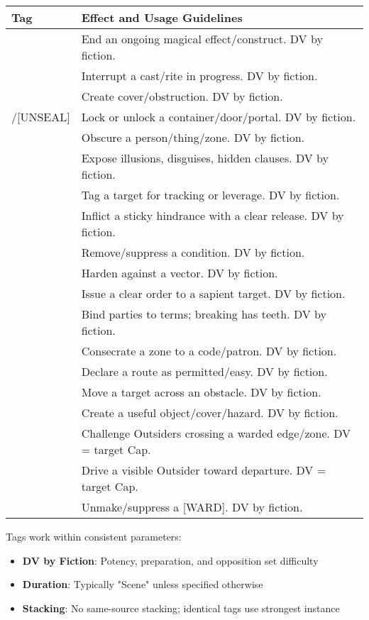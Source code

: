 \begin{fatebox}
\begin{tabularx}{\textwidth}{lX}
\toprule
\textbf{Tag} & \textbf{Effect and Usage Guidelines} \\
\midrule
[DISPEL] & End an ongoing magical effect/construct. DV by fiction. \\
[COUNTER] & Interrupt a cast/rite in progress. DV by fiction. \\
[BARRIER] & Create cover/obstruction. DV by fiction. \\
[SEAL]/[UNSEAL] & Lock or unlock a container/door/portal. DV by fiction. \\
[VEIL] & Obscure a person/thing/zone. DV by fiction. \\
[REVEAL] & Expose illusions, disguises, hidden clauses. DV by fiction. \\
[MARK] & Tag a target for tracking or leverage. DV by fiction. \\
[CURSE] & Inflict a sticky hindrance with a clear release. DV by fiction. \\
[CLEANSE] & Remove/suppress a condition. DV by fiction. \\
[FORTIFY] & Harden against a vector. DV by fiction. \\
[COMMAND] & Issue a clear order to a sapient target. DV by fiction. \\
[OATH] & Bind parties to terms; breaking has teeth. DV by fiction. \\
[SANCTIFY] & Consecrate a zone to a code/patron. DV by fiction. \\
[PASSAGE] & Declare a route as permitted/easy. DV by fiction. \\
[TRANSPORT] & Move a target across an obstacle. DV by fiction. \\
[CONJURE] & Create a useful object/cover/hazard. DV by fiction. \\
[WARD] & Challenge Outsiders crossing a warded edge/zone. DV = target Cap. \\
[BANISH] & Drive a visible Outsider toward departure. DV = target Cap. \\
[UNWARD] & Unmake/suppress a [WARD]. DV by fiction. \\
\bottomrule
\end{tabularx}
\end{fatebox}

Tags work within consistent parameters:
\begin{itemize}
    \item \textbf{DV by Fiction}: Potency, preparation, and opposition set difficulty
    \item \textbf{Duration}: Typically "Scene" unless specified otherwise
    \item \textbf{Stacking}: No same-source stacking; identical tags use strongest instance
\end{itemize}

